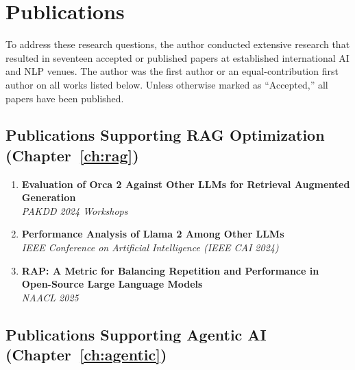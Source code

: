 \section{Publications}
\label{sec:publications}

To address these research questions, the author conducted extensive research that resulted in seventeen accepted or published papers at established international AI and NLP venues. The author was the first author or an equal-contribution first author on all works listed below. Unless otherwise marked as ``Accepted,'' all papers have been published.

\subsection{Publications Supporting RAG Optimization (Chapter~\ref{ch:rag})}

\begin{enumerate}[leftmargin=*]
    \item \textbf{Evaluation of Orca 2 Against Other LLMs for Retrieval Augmented Generation}~\cite{huang2024orca2rag}\\
    \textit{PAKDD 2024 Workshops}
    
    \item \textbf{Performance Analysis of Llama 2 Among Other LLMs}~\cite{huang2024llama2}\\
    \textit{IEEE Conference on Artificial Intelligence (IEEE CAI 2024)}
    
    \item \textbf{RAP: A Metric for Balancing Repetition and Performance in Open-Source Large Language Models}~\cite{huang2025rap}\\
    \textit{NAACL 2025}
\end{enumerate}

\subsection{Publications Supporting Agentic AI (Chapter~\ref{ch:agentic})}

